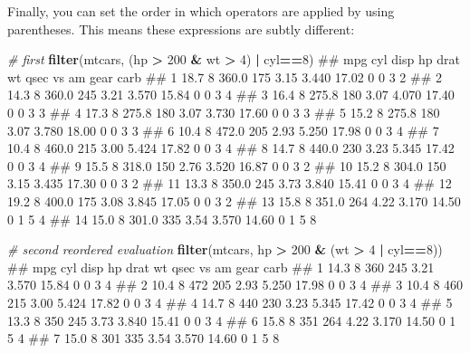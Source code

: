 \documentclass[]{article}
\newenvironment{Shaded}{\begin{snugshade}}{\end{snugshade}}
\newcommand{\KeywordTok}[1]{\textcolor[rgb]{0.13,0.29,0.53}{\textbf{#1}}}
\newcommand{\DecValTok}[1]{\textcolor[rgb]{0.00,0.00,0.81}{#1}}
\newcommand{\StringTok}[1]{\textcolor[rgb]{0.31,0.60,0.02}{#1}}
\newcommand{\CommentTok}[1]{\textcolor[rgb]{0.56,0.35,0.01}{\textit{#1}}}
\newcommand{\OperatorTok}[1]{\textcolor[rgb]{0.81,0.36,0.00}{\textbf{#1}}}
\newcommand{\NormalTok}[1]{#1}
\theoremstyle{definition}
\theoremstyle{definition}
\theoremstyle{definition}
\theoremstyle{remark}
\begin{document}
Finally, you can set the order in which operators are applied by using
parentheses. This means these expressions are subtly different:

\begin{Shaded}
\begin{Highlighting}[]
\CommentTok{# first}
\KeywordTok{filter}\NormalTok{(mtcars, (hp }\OperatorTok{>}\StringTok{ }\DecValTok{200} \OperatorTok{&}\StringTok{ }\NormalTok{wt }\OperatorTok{>}\StringTok{ }\DecValTok{4}\NormalTok{) }\OperatorTok{|}\StringTok{ }\NormalTok{cyl}\OperatorTok{==}\DecValTok{8}\NormalTok{)}
\NormalTok{##     mpg cyl  disp  hp drat    wt  qsec vs am gear carb}
\NormalTok{## 1  18.7   8 360.0 175 3.15 3.440 17.02  0  0    3    2}
\NormalTok{## 2  14.3   8 360.0 245 3.21 3.570 15.84  0  0    3    4}
\NormalTok{## 3  16.4   8 275.8 180 3.07 4.070 17.40  0  0    3    3}
\NormalTok{## 4  17.3   8 275.8 180 3.07 3.730 17.60  0  0    3    3}
\NormalTok{## 5  15.2   8 275.8 180 3.07 3.780 18.00  0  0    3    3}
\NormalTok{## 6  10.4   8 472.0 205 2.93 5.250 17.98  0  0    3    4}
\NormalTok{## 7  10.4   8 460.0 215 3.00 5.424 17.82  0  0    3    4}
\NormalTok{## 8  14.7   8 440.0 230 3.23 5.345 17.42  0  0    3    4}
\NormalTok{## 9  15.5   8 318.0 150 2.76 3.520 16.87  0  0    3    2}
\NormalTok{## 10 15.2   8 304.0 150 3.15 3.435 17.30  0  0    3    2}
\NormalTok{## 11 13.3   8 350.0 245 3.73 3.840 15.41  0  0    3    4}
\NormalTok{## 12 19.2   8 400.0 175 3.08 3.845 17.05  0  0    3    2}
\NormalTok{## 13 15.8   8 351.0 264 4.22 3.170 14.50  0  1    5    4}
\NormalTok{## 14 15.0   8 301.0 335 3.54 3.570 14.60  0  1    5    8}

\CommentTok{# second reordered evaluation}
\KeywordTok{filter}\NormalTok{(mtcars, hp }\OperatorTok{>}\StringTok{ }\DecValTok{200} \OperatorTok{&}\StringTok{ }\NormalTok{(wt }\OperatorTok{>}\StringTok{ }\DecValTok{4} \OperatorTok{|}\StringTok{ }\NormalTok{cyl}\OperatorTok{==}\DecValTok{8}\NormalTok{))}
\NormalTok{##    mpg cyl disp  hp drat    wt  qsec vs am gear carb}
\NormalTok{## 1 14.3   8  360 245 3.21 3.570 15.84  0  0    3    4}
\NormalTok{## 2 10.4   8  472 205 2.93 5.250 17.98  0  0    3    4}
\NormalTok{## 3 10.4   8  460 215 3.00 5.424 17.82  0  0    3    4}
\NormalTok{## 4 14.7   8  440 230 3.23 5.345 17.42  0  0    3    4}
\NormalTok{## 5 13.3   8  350 245 3.73 3.840 15.41  0  0    3    4}
\NormalTok{## 6 15.8   8  351 264 4.22 3.170 14.50  0  1    5    4}
\NormalTok{## 7 15.0   8  301 335 3.54 3.570 14.60  0  1    5    8}
\end{Highlighting}
\end{Shaded}
\end{document}
